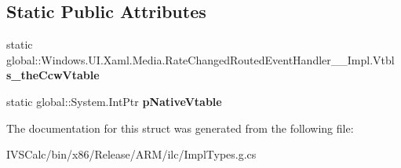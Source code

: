 \subsection*{Static Public Attributes}
\begin{DoxyCompactItemize}
\item 
\mbox{\label{struct_windows_1_1_u_i_1_1_xaml_1_1_media_1_1_rate_changed_routed_event_handler_____impl_1_1_vtbl_a007f9a78451ab88ece3338b9a863b6c4}} 
static global\+::\+Windows.\+U\+I.\+Xaml.\+Media.\+Rate\+Changed\+Routed\+Event\+Handler\+\_\+\+\_\+\+Impl.\+Vtbl {\bfseries s\+\_\+the\+Ccw\+Vtable}
\item 
\mbox{\label{struct_windows_1_1_u_i_1_1_xaml_1_1_media_1_1_rate_changed_routed_event_handler_____impl_1_1_vtbl_a01334eebb4fc600c0d38a70567d24df7}} 
static global\+::\+System.\+Int\+Ptr {\bfseries p\+Native\+Vtable}
\end{DoxyCompactItemize}


The documentation for this struct was generated from the following file\+:\begin{DoxyCompactItemize}
\item 
I\+V\+S\+Calc/bin/x86/\+Release/\+A\+R\+M/ilc/Impl\+Types.\+g.\+cs\end{DoxyCompactItemize}
